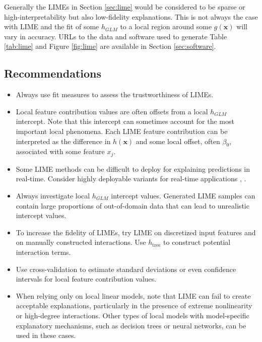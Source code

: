 \documentclass[11pt]{asaproc}
\begin{document}
Generally the LIMEs in Section \ref{sec:lime} would be considered to be sparse or high-interpretability but also low-fidelity explanations. This is not always the case with LIME and the fit of some $h_{GLM}$ to a local region around some $g(\mathbf{x})$ will vary in accuracy. URLs to the data and software used to generate Table \ref{tab:lime} and Figure \ref{fig:lime} are available in Section \ref{sec:software}.

\subsection{Recommendations}

\begin{itemize}
	
	\item Always use fit measures to assess the trustworthiness of LIMEs.

	\item Local feature contribution values are often offsets from a local $h_{GLM}$ intercept. Note that this intercept can sometimes account for the most important local phenomena. Each LIME feature contribution can be interpreted as the difference in $h(\mathbf{x})$ and some local offset, often $\beta_0$, associated with some  feature $x_j$.

	\item Some LIME methods can be difficult to deploy for explaining predictions in real-time. Consider highly deployable variants for real-time applications \cite{h2o_mli_booklet}, \cite{lime-sup}.
		
	\item Always investigate local $h_{GLM}$ intercept values. Generated LIME samples can contain large proportions of out-of-domain data that can lead to unrealistic intercept values. 
		
	\item To increase the fidelity of LIMEs, try LIME on discretized input features and on manually constructed interactions. Use $h_{\text{tree}}$ to construct potential interaction terms.
 	
	\item Use cross-validation to estimate standard deviations or even confidence intervals for local feature contribution values.
	
	\item When relying only on local linear models, note that LIME can fail to create acceptable explanations, particularly in the presence of extreme nonlinearity or high-degree interactions. Other types of local models with model-specific explanatory mechanisms, such as decision trees or neural networks, can be used in these cases. 
	
\end{itemize}
\end{document}
